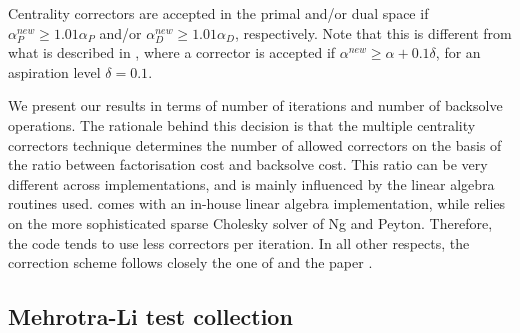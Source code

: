 Centrality correctors are accepted in the primal and/or dual space
if ${\alpha}_{P}^{new} \geq 1.01 \alpha_{P}$ 
and/or ${\alpha}_{D}^{new} \geq 1.01 \alpha_{D}$, respectively.
Note that this is different from what is described in \cite{Gondzio96}, where
a corrector is accepted if ${\alpha}^{new} \geq \alpha + 0.1\delta$, 
for an aspiration level $\delta = 0.1$.

We present our results in terms of number of iterations and number 
of backsolve operations. The rationale behind this decision is that 
the multiple centrality correctors technique determines the number 
of allowed correctors on the basis of the ratio between factorisation 
cost and backsolve cost. This ratio can be very different across 
implementations, and is mainly influenced by the linear algebra 
routines used. 
\HOPDM comes with an in-house linear algebra implementation, while
\PCx relies on the more sophisticated sparse Cholesky solver
of Ng and Peyton. Therefore, the \PCx code tends to use less 
correctors per iteration.
In all other respects, the correction scheme follows closely the one
of \HOPDM and the paper \cite{Gondzio96}.

%
%
\subsection{Mehrotra-Li test collection}
\label{ML-tests}

